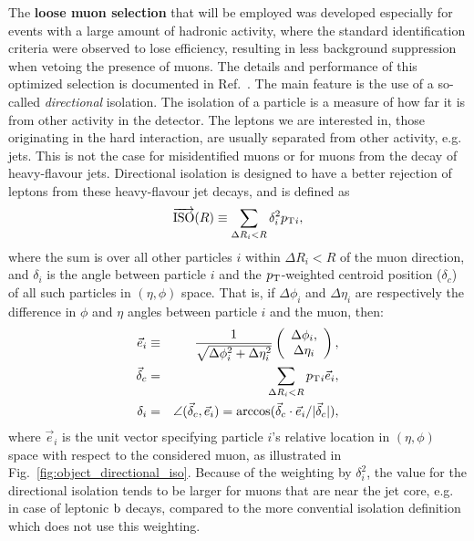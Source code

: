 The \textbf{loose muon selection} that will be employed was developed especially for events with a
large amount of hadronic activity, where the standard identification criteria were observed to lose
efficiency, resulting in less background suppression when vetoing the presence of muons. 
The details and performance of this optimized selection is documented in
Ref.~\cite{CMS-AN2011-498}. 
The main feature is the use of a so-called \textit{directional} isolation.
The isolation of a particle is a measure of how far it is from other activity in the detector. The
leptons we are interested in, those originating in the hard interaction, are usually separated from
other activity, e.g. jets. This is not the case for misidentified muons or for muons from the decay
of heavy-flavour jets. Directional isolation is designed to have a better rejection of leptons from
these heavy-flavour jet decays, and is defined as
\begin{equation}
\overrightarrow{\mathrm{ISO}}(R) \equiv \sum_{\Delta R_{i} < R} \delta_{i}^{2}p_{\mathrm{T}}{}_{i} ,
\end{equation}
where the sum is over all other particles $i$ within $\Delta R_{i}<R$ of the muon direction,
and $\delta_{i}$ is the angle between particle $i$ and the $p_{\mathrm{T}}$-weighted centroid position
($\delta_{c}$) of all such particles in $(\eta,\phi)$ space. That is, if $\Delta\phi_i$ and
$\Delta\eta_i$ are respectively the difference in $\phi$ and $\eta$ angles between particle $i$ and
the muon, then:
\begin{eqnarray*}
\vec{e}_{i} & \equiv & \frac{1}{\sqrt{\Delta\phi_{i}^{2}+\Delta\eta_{i}^{2}}}\left(\begin{array}{c}
\Delta\phi_{i},\\
\Delta\eta_{i}
\end{array}\right),\\
\vec{\delta}_{c} & = & \sum_{\Delta R_{i}<R}p_{\mathrm{T}}{}_{i}\vec{e}_{i},\\
\delta_{i} & = &
\angle(\vec{\delta}_{c},\vec{e}_{i})=\arccos(\vec{\delta}_{c}\cdot\vec{e}_{i}/|\vec{\delta}_{c}|),
\end{eqnarray*}
where $\vec{e}_{i}$ is the unit vector specifying particle $i$'s relative location in $(\eta,\phi)$
space with respect to the considered muon, as illustrated in Fig.~\ref{fig:object_directional_iso}.
Because of the weighting by $\delta_{i}^{2}$, the value for the directional isolation tends to be
larger for muons that are near the jet core, e.g. in case of leptonic $\mathrm{b}$ decays, compared to
the more convential isolation definition which does not use this weighting. 

